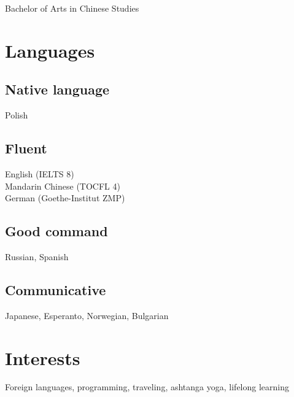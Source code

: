 \documentclass[10pt,a4paper]{article}
\begin{document}
\begin{minipage}[t]{0.3\textwidth}
  \small Bachelor of Arts in Chinese Studies
  
  \vspace{12pt}

  \section{Languages}

  \small
  \subsection{Native language} Polish \vspace{4pt}

  \subsection{Fluent}
  English (IELTS 8)\\ Mandarin Chinese (TOCFL 4)\\ German (Goethe-Institut ZMP) \vspace{4pt}

  \subsection{Good command}
  Russian, Spanish \vspace{4pt}

  \subsection{Communicative}
  Japanese, Esperanto, Norwegian, Bulgarian

  \vspace{12pt}

  \section{Interests}

  \small Foreign languages, programming, traveling, ashtanga yoga, lifelong learning

\end{minipage}
\end{document}
